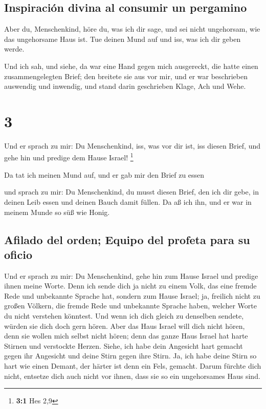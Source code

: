 \hypertarget{inspiraciuxf3n-divina-al-consumir-un-pergamino}{%
\subsection{Inspiración divina al consumir un
pergamino}\label{inspiraciuxf3n-divina-al-consumir-un-pergamino}}

 Aber du, Menschenkind, höre du, was ich dir sage, und sei
nicht ungehorsam, wie das ungehorsame Haus ist. Tue deinen Mund auf und
iss, was ich dir geben werde.

 Und ich sah, und siehe, da war eine Hand gegen mich
ausgereckt, die hatte einen zusammengelegten Brief;  den
breitete sie aus vor mir, und er war beschrieben auswendig und inwendig,
und stand darin geschrieben Klage, Ach und Wehe.

\hypertarget{section-2}{%
\section{3}\label{section-2}}

 Und er sprach zu mir: Du Menschenkind, iss, was vor dir
ist, iss diesen Brief, und gehe hin und predige dem Hause Israel!
\footnote{\textbf{3:1} Hes 2,9}

 Da tat ich meinen Mund auf, und er gab mir den Brief zu
essen

 und sprach zu mir: Du Menschenkind, du musst diesen
Brief, den ich dir gebe, in deinen Leib essen und deinen Bauch damit
füllen. Da aß ich ihn, und er war in meinem Munde so süß wie Honig.

\hypertarget{afilado-del-orden-equipo-del-profeta-para-su-oficio}{%
\subsection{Afilado del orden; Equipo del profeta para su
oficio}\label{afilado-del-orden-equipo-del-profeta-para-su-oficio}}

 Und er sprach zu mir: Du Menschenkind, gehe hin zum Hause
Israel und predige ihnen meine Worte.  Denn ich sende dich
ja nicht zu einem Volk, das eine fremde Rede und unbekannte Sprache hat,
sondern zum Hause Israel;  ja, freilich nicht zu großen
Völkern, die fremde Rede und unbekannte Sprache haben, welcher Worte du
nicht verstehen könntest. Und wenn ich dich gleich zu denselben sendete,
würden sie dich doch gern hören.  Aber das Haus Israel
will dich nicht hören, denn sie wollen mich selbst nicht hören; denn das
ganze Haus Israel hat harte Stirnen und verstockte Herzen.
 Siehe, ich habe dein Angesicht hart gemacht gegen ihr
Angesicht und deine Stirn gegen ihre Stirn.  Ja, ich habe
deine Stirn so hart wie einen Demant, der härter ist denn ein Fels,
gemacht. Darum fürchte dich nicht, entsetze dich auch nicht vor ihnen,
dass sie so ein ungehorsames Haus sind.

